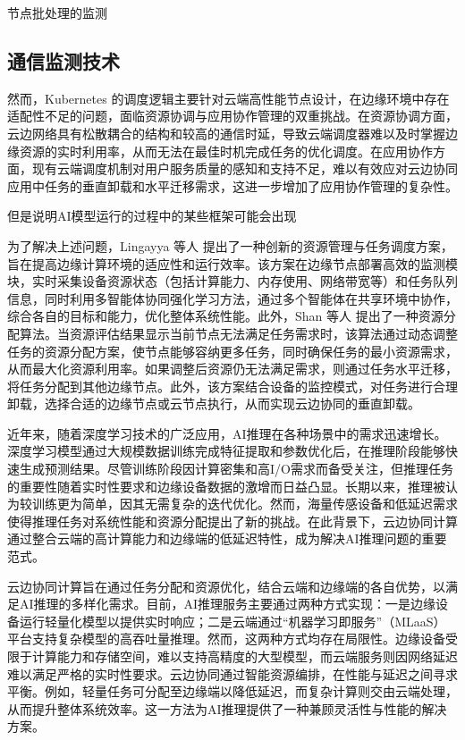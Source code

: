 节点批处理的监测

\subsection{通信监测技术}


然而，Kubernetes 的调度逻辑主要针对云端高性能节点设计，在边缘环境中存在适配性不足的问题，面临资源协调与应用协作管理的双重挑战。在资源协调方面，云边网络具有松散耦合的结构和较高的通信时延，导致云端调度器难以及时掌握边缘资源的实时利用率，从而无法在最佳时机完成任务的优化调度。在应用协作方面，现有云端调度机制对用户服务质量的感知和支持不足，难以有效应对云边协同应用中任务的垂直卸载和水平迁移需求，这进一步增加了应用协作管理的复杂性。

但是说明AI模型运行的过程中的某些框架可能会出现

为了解决上述问题，Lingayya 等人\cite{lingayya2024dynamic} 提出了一种创新的资源管理与任务调度方案，旨在提高边缘计算环境的适应性和运行效率。该方案在边缘节点部署高效的监测模块，实时采集设备资源状态（包括计算能力、内存使用、网络带宽等）和任务队列信息，同时利用多智能体协同强化学习方法，通过多个智能体在共享环境中协作，综合各自的目标和能力，优化整体系统性能。此外，Shan 等人\cite{shan2024kces} 提出了一种资源分配算法。当资源评估结果显示当前节点无法满足任务需求时，该算法通过动态调整任务的资源分配方案，使节点能够容纳更多任务，同时确保任务的最小资源需求，从而最大化资源利用率。如果调整后资源仍无法满足需求，则通过任务水平迁移，将任务分配到其他边缘节点。此外，该方案结合设备的监控模式，对任务进行合理卸载，选择合适的边缘节点或云节点执行，从而实现云边协同的垂直卸载。


近年来，随着深度学习技术的广泛应用，AI推理在各种场景中的需求迅速增长。深度学习模型通过大规模数据训练完成特征提取和参数优化后，在推理阶段能够快速生成预测结果。尽管训练阶段因计算密集和高I/O需求而备受关注，但推理任务的重要性随着实时性要求和边缘设备数据的激增而日益凸显。长期以来，推理被认为较训练更为简单，因其无需复杂的迭代优化。然而，海量传感设备和低延迟需求使得推理任务对系统性能和资源分配提出了新的挑战。在此背景下，云边协同计算通过整合云端的高计算能力和边缘端的低延迟特性，成为解决AI推理问题的重要范式。

云边协同计算旨在通过任务分配和资源优化，结合云端和边缘端的各自优势，以满足AI推理的多样化需求。目前，AI推理服务主要通过两种方式实现：一是边缘设备运行轻量化模型以提供实时响应；二是云端通过“机器学习即服务”（MLaaS）平台支持复杂模型的高吞吐量推理。然而，这两种方式均存在局限性。边缘设备受限于计算能力和存储空间，难以支持高精度的大型模型，而云端服务则因网络延迟难以满足严格的实时性要求。云边协同通过智能资源编排，在性能与延迟之间寻求平衡。例如，轻量任务可分配至边缘端以降低延迟，而复杂计算则交由云端处理，从而提升整体系统效率。这一方法为AI推理提供了一种兼顾灵活性与性能的解决方案。



